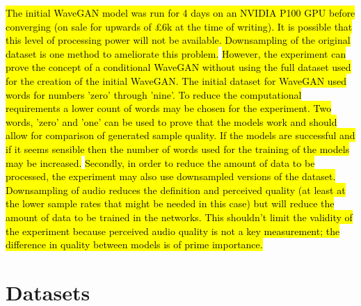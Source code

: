 \documentclass[titlepage]{article}
\begin{document}
\hl{
The initial WaveGAN model was run for 4 days on an NVIDIA P100 GPU before converging (on sale for upwards of £6k at the time of writing).
It is possible that this level of processing power will not be available.
Downsampling of the original dataset is one method to ameliorate this problem.
}
\newline
\newline
\hl{
However, the experiment can prove the concept of a conditional WaveGAN without using the full dataset used for the creation of the initial WaveGAN.
The initial dataset for WaveGAN used words for numbers 'zero' through 'nine'.
To reduce the computational requirements a lower count of words may be chosen for the experiment.
Two words, 'zero' and 'one' can be used to prove that the models work and should allow for comparison of generated sample quality.
If the models are successful and if it seems sensible then the number of words used for the training of the models may be increased.
}
\newline
\newline
\hl{
Secondly, in order to reduce the amount of data to be processed, the experiment may also use downsampled versions of the dataset.
Downsampling of audio reduces the definition and perceived quality (at least at the lower sample rates that might be needed in this case) but will reduce the amount of data to be trained in the networks.
This shouldn't limit the validity of the experiment because perceived audio quality is not a key measurement; the difference in quality between models is of prime importance.}

\section{Datasets}
\end{document}
